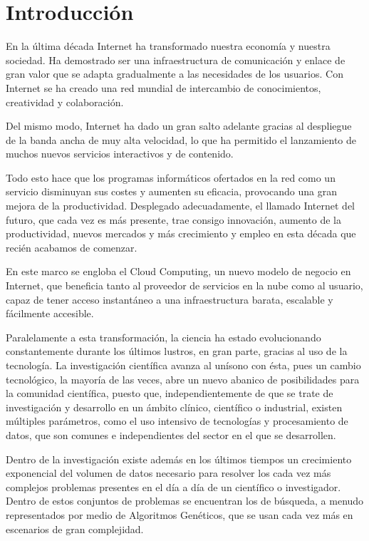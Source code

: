 \documentclass[runningheads]{llncs}
\begin{document}
\section{Introducción}
\noindent En la última década Internet ha transformado nuestra economía y nuestra sociedad. Ha demostrado ser una infraestructura de comunicación 
y enlace de gran valor que se adapta gradualmente a las necesidades de los usuarios. Con Internet se ha creado una red mundial de 
intercambio de conocimientos, creatividad y colaboración. 

Del mismo modo, Internet ha dado un gran salto adelante gracias al despliegue de la banda ancha de muy alta velocidad, lo que ha 
permitido el lanzamiento de muchos nuevos servicios interactivos y de contenido. 

Todo esto hace que los programas informáticos ofertados en la red como un servicio disminuyan sus costes y aumenten su eficacia, 
provocando una gran mejora de la productividad. Desplegado adecuadamente, el llamado Internet del futuro, que cada vez es más 
presente, trae consigo innovación, aumento de la productividad, nuevos mercados y más crecimiento y empleo en esta década que 
recién acabamos de comenzar. 

En este marco se engloba el Cloud Computing, un nuevo modelo de negocio en Internet, que beneficia tanto al proveedor de 
servicios en la nube como al usuario, capaz de tener acceso instantáneo a una infraestructura barata, escalable y fácilmente 
accesible. 
 
Paralelamente a esta transformación, la ciencia ha estado evolucionando constantemente durante los últimos lustros, en gran parte, 
gracias al uso  de la tecnología. La investigación científica avanza al unísono con ésta, pues un cambio tecnológico, la mayoría 
de las veces, abre un nuevo abanico de posibilidades para la comunidad científica, puesto que, independientemente de que se trate 
de investigación y desarrollo en un ámbito clínico, científico o industrial, existen múltiples parámetros, como el uso intensivo 
de tecnologías y procesamiento de datos, que son comunes e independientes del sector en el que se desarrollen. 

Dentro de la investigación existe además en los últimos tiempos un crecimiento exponencial del volumen de datos necesario para 
resolver los cada vez más complejos problemas presentes en el día a día de un científico o investigador. Dentro de estos conjuntos 
de problemas se encuentran los de búsqueda, a menudo representados por medio de Algoritmos Genéticos, que se usan cada vez más en 
escenarios de gran complejidad. 
\end{document}
